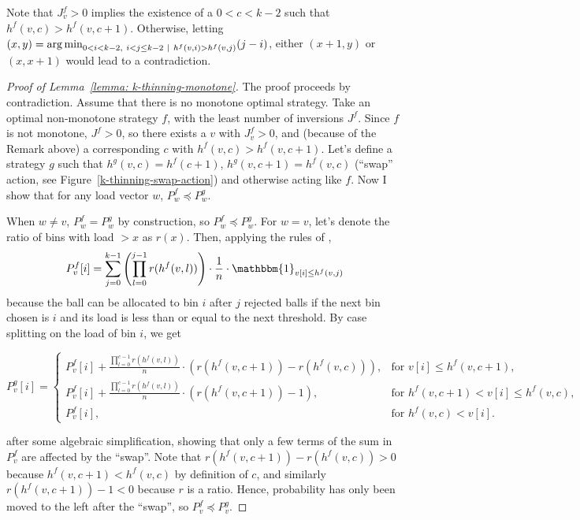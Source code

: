 \begin{remark} 
Note that $J^f_v>0$ implies the existence of a $0<c<k-2$ such that $h^f(v,c)>h^f(v,c+1)$. Otherwise, letting $(x,y)=\argmin_{0<i<k-2,\ i<j\leq k-2\ \mid\ h^f(v,i)>h^f(v,j)} (j-i)$, either $(x+1,y)$ or $(x,x+1)$ would lead to a contradiction. 
\end{remark}


\begin{proof}[Proof of Lemma~\ref{lemma: k-thinning-monotone}]
    The proof proceeds by contradiction. Assume that there is no monotone optimal strategy. Take an optimal non-monotone strategy $f$, with the least number of inversions $J^f$. Since $f$ is not monotone, $J^f>0$, so there exists a $v$ with $J^f_v>0$, and (because of the Remark above) a corresponding $c$ with $h^f(v,c)>h^f(v,c+1)$. Let's define a strategy $g$ such that $h^g(v,c)=h^f(c+1)$, $h^g(v,c+1)=h^f(v,c)$ (``swap'' action, see Figure~\ref{k-thinning-swap-action}) and otherwise acting like $f$. Now I show that for any load vector $w$, $P^f_w \preccurlyeq P^g_w$.
    
    When $w\neq v$, $P^f_w=P^g_w$ by construction, so $P^f_w \preccurlyeq P^g_w$. For $w=v$, let's denote the ratio of bins with load $>x$ as $r(x)$. Then, applying the rules of \KThinning, $$P^f_v[i]=\sum_{j=0}^{k-1} \left(\prod_{l=0}^{j-1} r(h^f(v,l))\right)\cdot\frac{1}{n}\cdot\mathbbm{1}_{v[i]\leq h^f(v,j)}$$ because the ball can be allocated to bin $i$ after $j$ rejected balls if the next bin chosen is $i$ and its load is less than or equal to the next threshold. By case splitting on the load of bin $i$, we get
    
    $$P^g_v[i]= \begin{cases}
        P^f_v[i]+\frac{\prod_{l=0}^{c-1} r(h^f(v,l))}{n}\cdot(r(h^f(v,c+1))-r(h^f(v,c))), & \text{for } v[i]\leq h^f(v,c+1),\\
        P^f_v[i]+\frac{\prod_{l=0}^{c-1} r(h^f(v,l))}{n}\cdot(r(h^f(v,c+1))-1), & \text{for } h^f(v,c+1)<v[i]\leq h^f(v,c),\\
        P^f_v[i], & \text{for } h^f(v,c)<v[i].
    \end{cases}$$
    
    after some algebraic simplification, showing that only a few terms of the sum in $P_v^f$ are affected by the ``swap''. Note that $r(h^f(v,c+1))-r(h^f(v,c))>0$ because $h^f(v,c+1)<h^f(v,c)$ by definition of $c$, and similarly $r(h^f(v,c+1))-1<0$ because $r$ is a ratio. Hence, probability has only been moved to the left after the ``swap'', so $P^f_v \preccurlyeq P^g_v$.
    

\end{proof}
